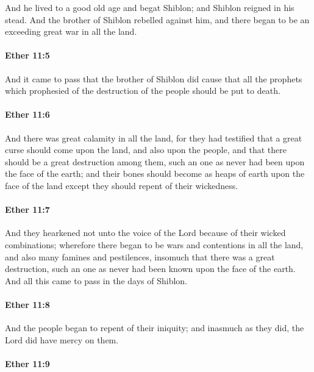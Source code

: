 			And he lived to a good old age and begat Shiblon;
			and Shiblon reigned in his stead.
			And the brother of Shiblon rebelled against him,
			and there began to be an exceeding great war in all the land.

		\paragraph{Ether 11:5} %
			\label{ETHER-11-5}

			And it came to pass that the brother of Shiblon did cause
			that all the prophets which prophesied of the destruction of the people
			should be put to death.

		\paragraph{Ether 11:6} %
			\label{ETHER-11-6}

			And there was great calamity in all the land,
			for they had testified that a great curse should come upon the land,
			and also upon the people,
			and that there should be a great destruction among them,
			such an one as never had been upon the face of the earth;
			and their bones should become as heaps of earth upon the face of the land
			except they should repent of their wickedness.

		\paragraph{Ether 11:7} %
			\label{ETHER-11-7}

			And they hearkened not unto the voice of the Lord
			because of their wicked combinations;
			wherefore there began to be wars and contentions in all the land,
			and also many famines and pestilences,
			insomuch that there was a great destruction,
			such an one as never had been known upon the face of the earth.
			And all this came to pass in the days of Shiblon.

		\paragraph{Ether 11:8} %
			\label{ETHER-11-8}

			And the people began to repent of their iniquity;
			and inasmuch as they did, the Lord did have mercy on them.

		\paragraph{Ether 11:9} %
			\label{ETHER-11-9}

